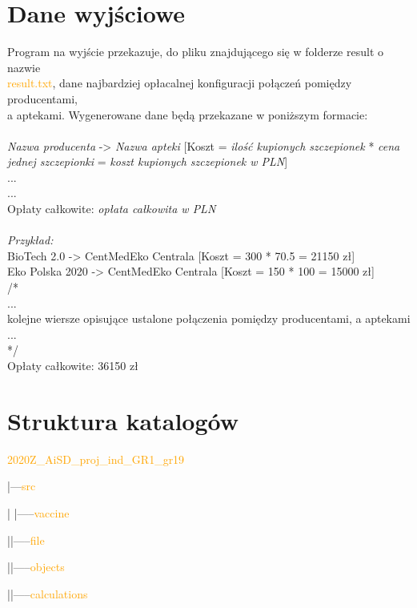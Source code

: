 \documentclass[]{article}
\begin{document}
\section{Dane wyjściowe}
Program na wyjście przekazuje, do pliku znajdującego się w folderze result o nazwie \\\textcolor{orange}{result.txt}, dane najbardziej opłacalnej konfiguracji połączeń pomiędzy producentami,\\
a aptekami. Wygenerowane dane będą przekazane w poniższym formacie:\\\\
\textit{Nazwa producenta} -> 
\textit{Nazwa apteki} [Koszt = 
\textit{ilość kupionych szczepionek} * 
\textit{cena jednej szczepionki} = 
\textit{koszt kupionych szczepionek w PLN}]\\
...\\
...\\
Opłaty całkowite: 
\textit{opłata całkowita w PLN}\\\\
\emph{Przykład:}\\
BioTech 2.0
\hspace{7mm} -> CentMedEko Centrala [Koszt = 300 * 70.5 = 21150 zł]\\
Eko Polska 2020  -> CentMedEko Centrala [Koszt = 150 * 100 = 15000 zł]\\
/*\\
...\\
kolejne wiersze opisujące ustalone połączenia pomiędzy producentami, a aptekami\\
...\\
*/\\
Opłaty całkowite: 36150 zł\\


\section{Struktura katalogów}
\textcolor{orange}{2020Z\_AiSD\_proj\_ind\_GR1\_gr19}

	|---\textcolor{orange}{src}
	
	|\hspace{4mm} |-----\textcolor{orange}{vaccine}

	|\hspace{15mm}|-----\textcolor{orange}{file}
	
	|\hspace{15mm}|-----\textcolor{orange}{objects}
	
	|\hspace{15mm}|-----\textcolor{orange}{calculations}
	
\end{document}
